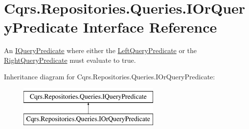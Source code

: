 \hypertarget{interfaceCqrs_1_1Repositories_1_1Queries_1_1IOrQueryPredicate}{}\section{Cqrs.\+Repositories.\+Queries.\+I\+Or\+Query\+Predicate Interface Reference}
\label{interfaceCqrs_1_1Repositories_1_1Queries_1_1IOrQueryPredicate}


An \hyperlink{interfaceCqrs_1_1Repositories_1_1Queries_1_1IQueryPredicate}{I\+Query\+Predicate} where either the \hyperlink{interfaceCqrs_1_1Repositories_1_1Queries_1_1IOrQueryPredicate_a714d125899714f5aabc2d50e4ffb9834_a714d125899714f5aabc2d50e4ffb9834}{Left\+Query\+Predicate} or the \hyperlink{interfaceCqrs_1_1Repositories_1_1Queries_1_1IOrQueryPredicate_a72ad26892989a09527ead9a2ecce5d47_a72ad26892989a09527ead9a2ecce5d47}{Right\+Query\+Predicate} must evaluate to true.  


Inheritance diagram for Cqrs.\+Repositories.\+Queries.\+I\+Or\+Query\+Predicate\+:\begin{figure}[H]
\begin{center}
\leavevmode
\includegraphics[height=2.000000cm]{interfaceCqrs_1_1Repositories_1_1Queries_1_1IOrQueryPredicate}
\end{center}
\end{figure}
